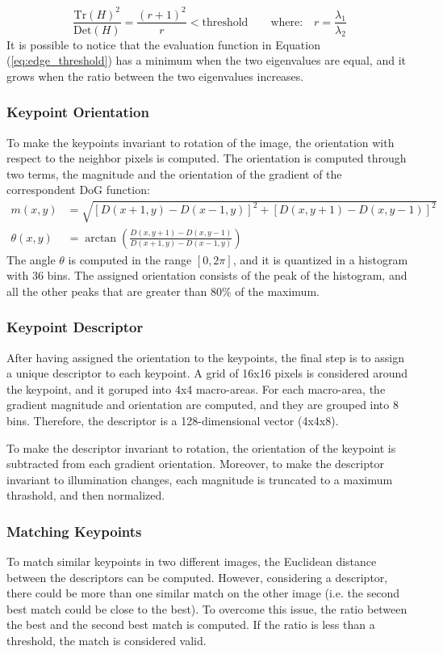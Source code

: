 \begin{equation}
    \frac{\text{Tr}(H)^2}{\text{Det}(H)} = \frac{(r+1)^2}{r} < \text{threshold}
    \qquad
    \text{where:} \quad r = \frac{\lambda_1}{\lambda_2}
    \label{eq:edge_threshold}
\end{equation}
It is possible to notice that the evaluation function in Equation 
(\ref{eq:edge_threshold}) has a minimum when the two eigenvalues are equal, 
and it grows when the ratio between the two eigenvalues increases.

\subsubsection{Keypoint Orientation}
To make the keypoints invariant to rotation of the image, the orientation with 
respect to the neighbor pixels is computed. The orientation is computed through 
two terms, the magnitude and the orientation of the gradient of the 
correspondent DoG function:
\begin{align*}
    m(x, y) &= \sqrt{\left[D(x+1, y) - D(x-1, y)\right]^2 + \left[D(x, y+1) - D(x, y-1)\right]^2} \\
    \theta(x, y) &= \arctan\left(\frac{D(x, y+1) - D(x, y-1)}{D(x+1, y) - D(x-1, y)}\right)
\end{align*}
The angle $\theta$ is computed in the range $[0, 2\pi]$, and it is quantized 
in a histogram with 36 bins. The assigned orientation consists of the peak of 
the histogram, and all the other peaks that are greater than 80\% of the maximum.

\subsubsection{Keypoint Descriptor}
After having assigned the orientation to the keypoints, the final step is to 
assign a unique descriptor to each keypoint. 
A grid of 16x16 pixels is considered around the keypoint, and it goruped into 
4x4 macro-areas. For each macro-area, the gradient magnitude and orientation 
are computed, and they are grouped into 8 bins. Therefore, the descriptor is 
a 128-dimensional vector (4x4x8).

To make the descriptor invariant to rotation, the orientation of the keypoint 
is subtracted from each gradient orientation.
Moreover, to make the descriptor invariant to illumination changes, each 
magnitude is truncated to a maximum thrashold, and then normalized.

\subsubsection{Matching Keypoints}
To match similar keypoints in two different images, the Euclidean distance 
between the descriptors can be computed. However, considering a descriptor, 
there could be more than one similar match on the other image (i.e. the second 
best match could be close to the best). To overcome this issue, the ratio between 
the best and the second best match is computed. If the ratio is less than a 
threshold, the match is considered valid.

